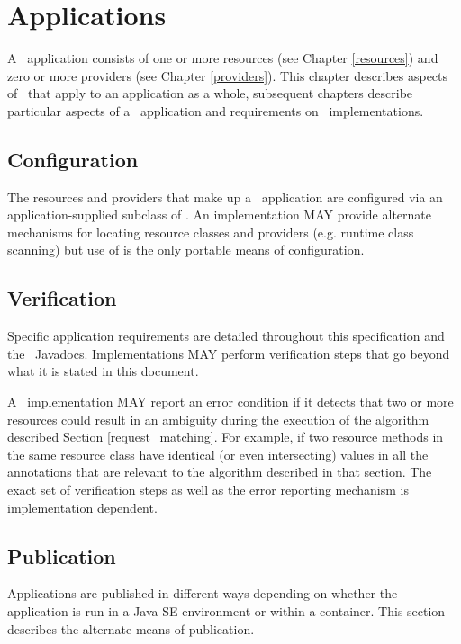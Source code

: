\chapter{Applications}
\label{applications}

A \jaxrs\ application consists of one or more resources (see Chapter \ref{resources}) and zero or more providers (see Chapter \ref{providers}). This chapter describes aspects of \jaxrs\ that apply to an application as a whole, subsequent chapters describe particular aspects of a \jaxrs\ application and requirements on \jaxrs\ implementations.

\section{Configuration}
\label{config}

The resources and providers that make up a \jaxrs\ application are configured via an application-supplied subclass of . An implementation MAY provide alternate mechanisms for locating resource classes and providers (e.g. runtime class scanning) but use of  is the only portable means of configuration.

\section{Verification}
\label{verification}

Specific application requirements are detailed throughout this specification and the \jaxrs\ Javadocs. Implementations MAY perform verification steps that go beyond what it is stated in this document. 

A \jaxrs\ implementation MAY report an error condition if it detects that two or more resources could result in an ambiguity during the execution of the algorithm described Section \ref{request_matching}. For example, if two resource methods in the same resource class have identical (or even intersecting) values in all the annotations that are relevant to the algorithm described in that section. The exact set of verification steps as well as the error reporting mechanism is implementation dependent.

\section{Publication}

Applications are published in different ways depending on whether the application is run in a Java SE environment or within a container. This section describes the alternate means of publication.


